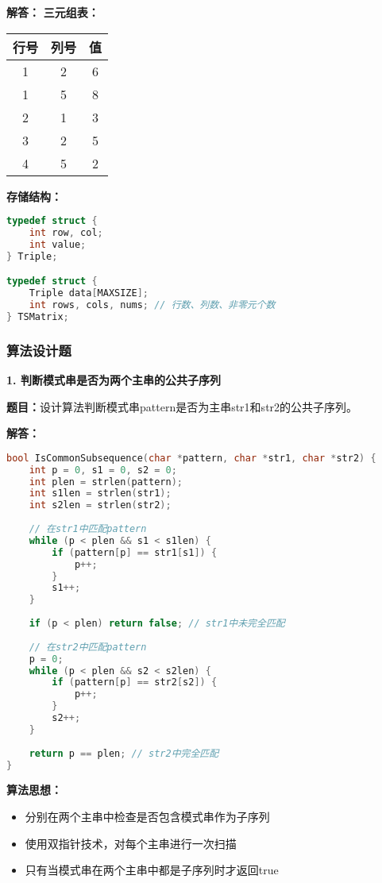 \documentclass[12pt,a4paper]{amsart}
\begin{document}
\textbf{解答：}
\textbf{三元组表：}
\begin{center}
\begin{tabular}{|c|c|c|}
\hline
行号 & 列号 & 值 \\
\hline
1 & 2 & 6 \\
1 & 5 & 8 \\
2 & 1 & 3 \\
3 & 2 & 5 \\
4 & 5 & 2 \\
\hline
\end{tabular}
\end{center}

\textbf{存储结构：}
\begin{lstlisting}[language=C++]
typedef struct {
    int row, col;
    int value;
} Triple;

typedef struct {
    Triple data[MAXSIZE];
    int rows, cols, nums; // 行数、列数、非零元个数
} TSMatrix;
\end{lstlisting}

\subsubsection{算法设计题}

\textbf{1. 判断模式串是否为两个主串的公共子序列}

\textbf{题目：}设计算法判断模式串pattern是否为主串str1和str2的公共子序列。

\textbf{解答：}
\begin{lstlisting}[language=C++]
bool IsCommonSubsequence(char *pattern, char *str1, char *str2) {
    int p = 0, s1 = 0, s2 = 0;
    int plen = strlen(pattern);
    int s1len = strlen(str1);
    int s2len = strlen(str2);
    
    // 在str1中匹配pattern
    while (p < plen && s1 < s1len) {
        if (pattern[p] == str1[s1]) {
            p++;
        }
        s1++;
    }
    
    if (p < plen) return false; // str1中未完全匹配
    
    // 在str2中匹配pattern
    p = 0;
    while (p < plen && s2 < s2len) {
        if (pattern[p] == str2[s2]) {
            p++;
        }
        s2++;
    }
    
    return p == plen; // str2中完全匹配
}
\end{lstlisting}

\textbf{算法思想：}
\begin{itemize}
\item 分别在两个主串中检查是否包含模式串作为子序列
\item 使用双指针技术，对每个主串进行一次扫描
\item 只有当模式串在两个主串中都是子序列时才返回true
\end{itemize}
\end{document}
